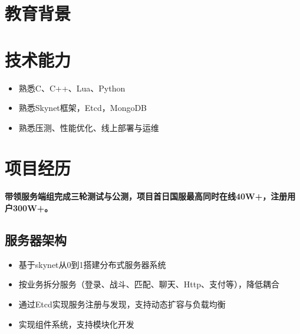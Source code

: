 \documentclass{resume}
\begin{document}
\fontsize{11pt}{18pt}\selectfont




\section{教育背景}



\section{技术能力}
\begin{itemize}[parsep=0.2ex]
  \item 熟悉C、C++、Lua、Python
  \item 熟悉Skynet框架，Etcd，MongoDB
  \item 熟悉压测、性能优化、线上部署与运维
\end{itemize}


\section{项目经历}

\textbf{带领服务端组完成三轮测试与公测，项目首日国服最高同时在线40W+，注册用户300W+。}

\subsection{服务器架构}
\begin{itemize}
  \item 基于skynet从0到1搭建分布式服务器系统
  \item 按业务拆分服务（登录、战斗、匹配、聊天、Http、支付等），降低耦合
  \item 通过Etcd实现服务注册与发现，支持动态扩容与负载均衡
  \item 实现组件系统，支持模块化开发
\end{itemize}
\end{document}
